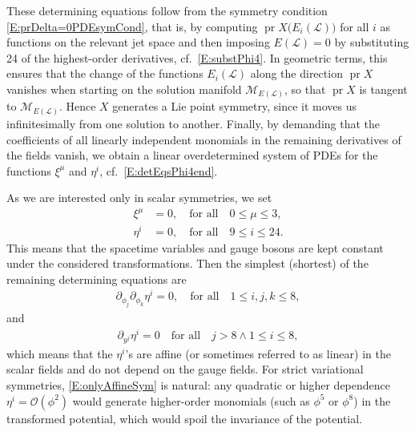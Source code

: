 \documentclass[a4paper,hidelinks, 12pt]{article}
\numberwithin{equation}{section}
\theoremstyle{plain}
\newcommand{\nn}{\nonumber}
\newcommand{\mc}{\mathcal}
\newcommand{\pr}{\operatorname{pr}}
\begin{document}
These determining equations follow from the symmetry condition
\eqref{E:prDelta=0PDEsymCond}, that is, by computing
$\pr X\big(E_i(\mathcal{L})\big)$ for all $i$ as functions on
the relevant jet space and then imposing $E(\mathcal{L})=0$ by substituting
24 of the highest-order derivatives, cf.~\eqref{E:substPhi4}. In geometric
terms, this ensures that the change of the functions $E_i(\mathcal{L})$
along the direction $\pr X$ vanishes when starting on the solution
manifold $\mc{M}_{E(\mc{L})}$, so that $\pr X$ is
tangent to $\mc{M}_{E(\mc{L})}$. Hence $X$ generates a Lie point
symmetry, since it moves us infinitesimally from one solution to another.
Finally, by demanding that the coefficients of all linearly independent
monomials in the remaining derivatives of the fields vanish, we obtain a
linear overdetermined system of PDEs for the functions $\xi^\mu$ and
$\eta^i$, cf.~\eqref{E:detEqsPhi4end}.


 

As we are interested only in scalar symmetries, we set
\begin{align}
	\xi^\mu&=0,\quad \text{for all}\quad 0\leq \mu \leq 3, \nn \\
	\eta^i&=0,\quad \text{for all} \quad 9\leq i \leq 24.
\end{align}
This means that the spacetime variables and gauge bosons are kept constant under the considered transformations. Then the simplest (shortest) of the remaining determining equations are
\begin{align}\label{E:onlyAffineSym}
	\partial_{\phi_j} \partial_{\phi_k} \eta^i =0,\quad \text{for all}\quad 1\leq i,j,k \leq 8,
\end{align}
and
\begin{align}
	\partial_{y^j} \eta^i =0 \quad \text{for all}\quad j>8 \wedge 1\leq i \leq 8, 
\end{align}
which means that the $\eta^i$'s are affine (or sometimes referred to as linear) in the scalar fields and do not depend on the gauge fields. 
For strict variational symmetries, \eqref{E:onlyAffineSym} is natural:
any quadratic or higher dependence
$\eta^i = \mathcal{O}(\phi^2)$ would generate higher-order monomials
(such as $\phi^5$ or $\phi^8$) in the transformed potential, which would spoil the invariance of the potential.
   
\end{document}
